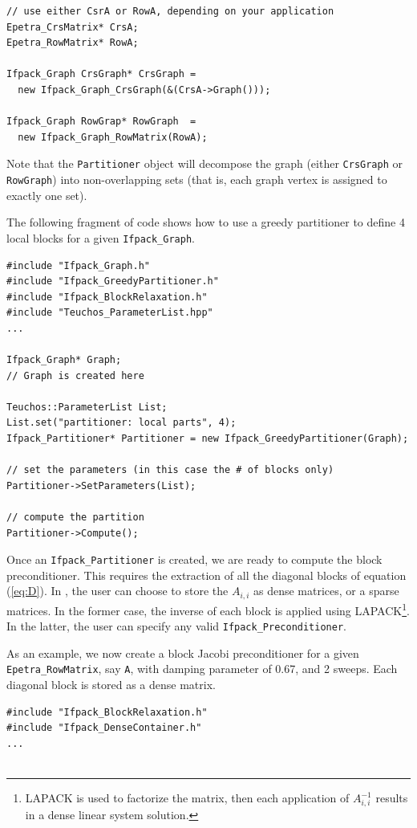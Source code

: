 {\begin{verbatim}
// use either CsrA or RowA, depending on your application
Epetra_CrsMatrix* CrsA;
Epetra_RowMatrix* RowA;

Ifpack_Graph CrsGraph* CrsGraph =
  new Ifpack_Graph_CrsGraph(&(CrsA->Graph()));

Ifpack_Graph RowGrap* RowGraph  =
  new Ifpack_Graph_RowMatrix(RowA);
\end{verbatim}
Note that the \verb!Partitioner! object will decompose the graph (either
\verb!CrsGraph! or \verb!RowGraph!) into
non-overlapping sets (that is, each graph vertex is assigned to exactly one
set).

The following fragment of code shows how to use a greedy partitioner to define
4 local blocks for a given \verb!Ifpack_Graph!.

\begin{verbatim}
#include "Ifpack_Graph.h"
#include "Ifpack_GreedyPartitioner.h"
#include "Ifpack_BlockRelaxation.h"
#include "Teuchos_ParameterList.hpp"
...

Ifpack_Graph* Graph;   
// Graph is created here

Teuchos::ParameterList List;
List.set("partitioner: local parts", 4);
Ifpack_Partitioner* Partitioner = new Ifpack_GreedyPartitioner(Graph);

// set the parameters (in this case the # of blocks only)
Partitioner->SetParameters(List);

// compute the partition
Partitioner->Compute();
\end{verbatim}

Once an \verb!Ifpack_Partitioner! is created, we are ready to
compute the block preconditioner. This requires the extraction of
all the diagonal blocks of equation (\ref{eq:D}). In \ifpack, the
user can choose to store the $A_{i,i}$ as dense matrices, or a sparse
matrices. In the former case, the inverse of each block is applied using
LAPACK\footnote{LAPACK is used to factorize the matrix, then each application
  of $A_{i,i}^{-1}$ results in a dense linear system solution.}. In the
  latter, the user can specify any valid \verb!Ifpack_Preconditioner!.

As an example, we now create a block Jacobi preconditioner for 
a given \verb!Epetra_RowMatrix!, say \verb!A!,
with damping parameter of 0.67, and 2 sweeps. Each diagonal block is stored as a dense
matrix.

\begin{verbatim}
#include "Ifpack_BlockRelaxation.h"
#include "Ifpack_DenseContainer.h"
...


\end{verbatim}}
